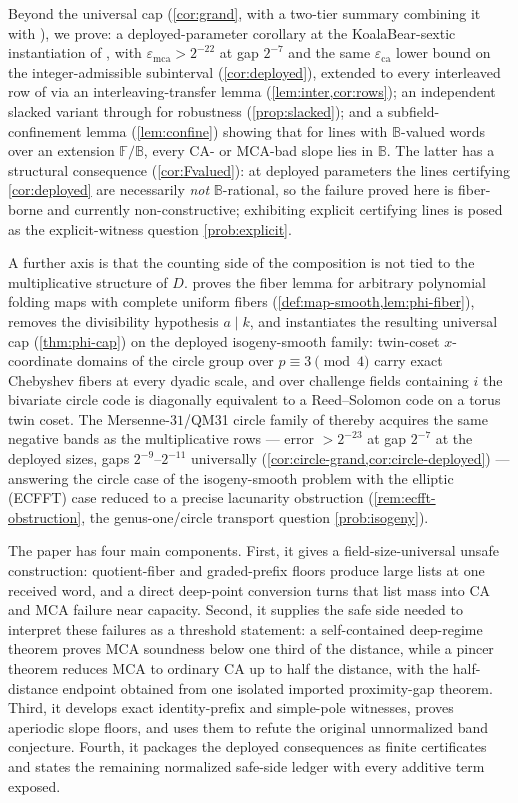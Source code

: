 \documentclass[11pt]{article}
\theoremstyle{definition}
\theoremstyle{remark}
\newcommand{\F}{\mathbb{F}}
\newcommand{\B}{\mathbb{B}}
\newcommand{\eca}{\varepsilon_{\mathrm{ca}}}
\newcommand{\emca}{\varepsilon_{\mathrm{mca}}}
\begin{document}
Beyond the universal cap (\cref{cor:grand}, with a two-tier summary combining it with \cite{Cho26b}), we prove: a deployed-parameter corollary at the KoalaBear-sextic instantiation of \cite[\S6.3]{ABF26}, with $\emca>2^{-22}$ at gap $2^{-7}$ and the same $\eca$ lower bound on the integer-admissible subinterval (\cref{cor:deployed}), extended to every interleaved row of \cite[Tables~2--3]{ABF26} via an interleaving-transfer lemma (\cref{lem:inter,cor:rows}); an independent slacked variant through \cite[Thm.~1.9]{BCHKS25} for robustness (\cref{prop:slacked}); and a subfield-confinement lemma (\cref{lem:confine}) showing that for lines with $\B$-valued words over an extension $\F/\B$, every CA- or MCA-bad slope lies in $\B$. The latter has a structural consequence (\cref{cor:Fvalued}): at deployed parameters the lines certifying \cref{cor:deployed} are necessarily \emph{not} $\B$-rational, so the failure proved here is fiber-borne and currently non-constructive; exhibiting explicit certifying lines is posed as the explicit-witness question \cref{prob:explicit}.

A further axis is that the counting side of the composition is not tied to the multiplicative structure of $D$.  proves the fiber lemma for arbitrary polynomial folding maps with complete uniform fibers (\cref{def:map-smooth,lem:phi-fiber}), removes the divisibility hypothesis $a\mid k$, and instantiates the resulting universal cap (\cref{thm:phi-cap}) on the deployed isogeny-smooth family: twin-coset $x$-coordinate domains of the circle group over $p\equiv3\pmod4$ carry exact Chebyshev fibers at every dyadic scale, and over challenge fields containing $i$ the bivariate circle code is diagonally equivalent to a Reed--Solomon code on a torus twin coset. The Mersenne-$31$/QM31 circle family of \cite{HLP24} thereby acquires the same negative bands as the multiplicative rows --- error $>2^{-23}$ at gap $2^{-7}$ at the deployed sizes, gaps $2^{-9}$--$2^{-11}$ universally (\cref{cor:circle-grand,cor:circle-deployed}) --- answering the circle case of the isogeny-smooth problem with the elliptic (ECFFT) case reduced to a precise lacunarity obstruction (\cref{rem:ecfft-obstruction}, the genus-one/circle transport question \cref{prob:isogeny}).

The paper has four main components.  First, it gives a field-size-universal unsafe construction: quotient-fiber and graded-prefix floors produce large lists at one received word, and a direct deep-point conversion turns that list mass into CA and MCA failure near capacity.  Second, it supplies the safe side needed to interpret these failures as a threshold statement: a self-contained deep-regime theorem proves MCA soundness below one third of the distance, while a pincer theorem reduces MCA to ordinary CA up to half the distance, with the half-distance endpoint obtained from one isolated imported proximity-gap theorem.  Third, it develops exact identity-prefix and simple-pole witnesses, proves aperiodic slope floors, and uses them to refute the original unnormalized band conjecture.  Fourth, it packages the deployed consequences as finite certificates and states the remaining normalized safe-side ledger with every additive term exposed.
\end{document}
